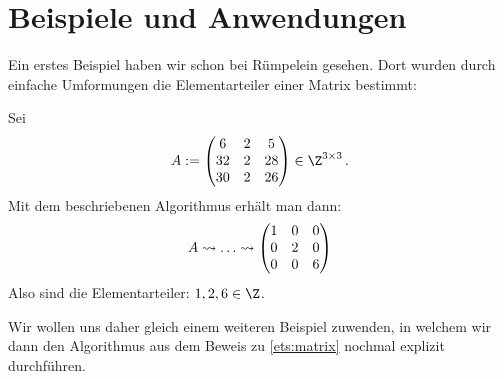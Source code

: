 
\chapter{Beispiele und Anwendungen}
Ein erstes Beispiel haben wir schon bei Rümpelein\cite{talk:ruemp} gesehen. Dort wurden
durch einfache Umformungen die Elementarteiler einer Matrix bestimmt:

\begin{thBeisp}
    Sei 
    \[ A := \Matrix{
           6 & 2 &  5 \\
          32 & 2 & 28 \\
          30 & 2 & 26  } \in \Z^{3\times3}
    \,. \]
    Mit dem beschriebenen Algorithmus erhält man dann:
    \[
        A
        \rightsquigarrow \ldots
        \rightsquigarrow 
    \begin{pmatrix} 
        1 & 0 & 0 \\
        0 & 2 & 0 \\
        0 & 0 & 6   \end{pmatrix}
    \]
    Also sind die Elementarteiler: $1,2,6 \in\Z$.
\end{thBeisp}

Wir wollen uns daher gleich einem weiteren Beispiel zuwenden, in welchem wir
dann den Algorithmus aus dem Beweis zu \cref{ets:matrix} nochmal explizit
durchführen.

